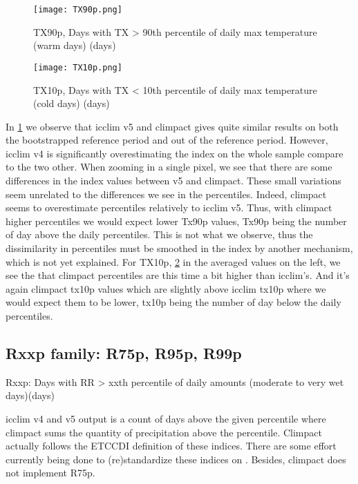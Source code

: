 \documentclass[a4paper,11pt]{article}
\begin{document}
            \begin{figure}[!hbt]
                \centering
                \texttt{[image: TX90p.png]}
                \caption{TX90p, Days with TX > 90th percentile of daily max temperature (warm days) (days)}
                \label{figure/tx90p}
            \end{figure}

            \begin{figure}[!hbt]
                \centering
                \texttt{[image: TX10p.png]}
                \caption{TX10p, Days with TX < 10th percentile of daily max temperature (cold days) (days)}
                \label{figure/tx10p}
            \end{figure}

            In \ref{figure/tx90p} we observe that icclim v5 and climpact gives quite similar results on both the bootstrapped reference period and out of the reference period.
            However, icclim v4 is significantly overestimating the index on the whole sample compare to the two other.
            When zooming in a single pixel, we see that there are some differences in the index values between v5 and climpact.
            These small variations seem unrelated to the differences we see in the percentiles.
            Indeed, climpact seems to overestimate percentiles relatively to icclim v5. Thus, with climpact higher percentiles we would expect lower Tx90p values, Tx90p being the number of day above the daily percentiles.
            This is not what we observe, thus the dissimilarity in percentiles must be smoothed in the index by another mechanism, which is not yet explained.
            For TX10p, \ref{figure/tx10p} in the averaged values on the left, we see the that climpact percentiles are this time a bit higher than icclim's.
            And it's again climpact tx10p values which are slightly above icclim tx10p where we would expect them to be lower, tx10p being the number of day below the daily percentiles.

        \subsection{Rxxp family: R75p, R95p, R99p}
            Rxxp: Days with RR > xxth percentile of daily amounts (moderate to very wet days)(days)

            icclim v4 and v5 output is a count of days above the given percentile where climpact sums the quantity of precipitation above the percentile. 
            Climpact actually follows the ETCCDI\cite{doc/etccdi} definition of these indices.
            There are some effort currently being done to (re)standardize these indices on \cite{gh/clixmeta}.
            Besides, climpact does not implement R75p.
\end{document}
